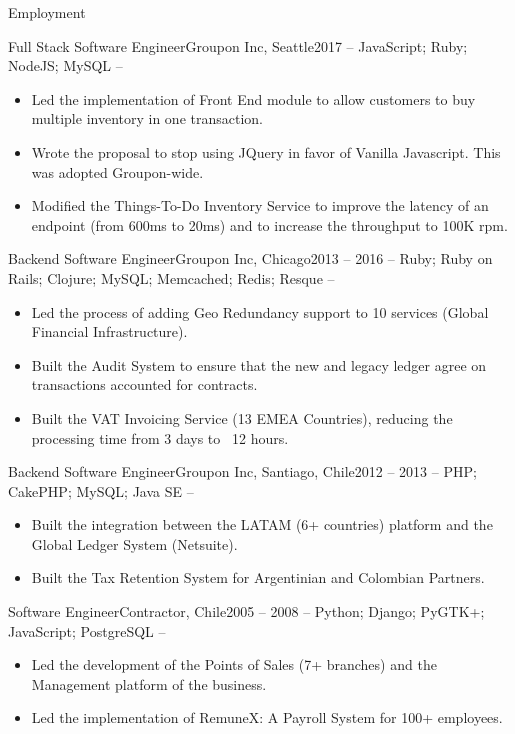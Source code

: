 \documentclass[includefoot]{mcdowellcv}
\begin{document}
\begin{cvsection}{Employment}
\begin{cvsubsection}{Full Stack Software Engineer}{Groupon Inc, Seattle}{2017}
			 -- JavaScript; Ruby; NodeJS; MySQL --
			\begin{itemize}
			 	\item Led the implementation of Front End module to allow customers to buy multiple inventory in one transaction. 
				\item Wrote the proposal to stop using JQuery in favor of Vanilla Javascript. This was adopted Groupon-wide. 
				\item Modified the Things-To-Do Inventory Service to improve the latency of an endpoint (from 600ms to 20ms) and to increase the throughput to 100K rpm.
			\end{itemize}
		\end{cvsubsection}
		\begin{cvsubsection}{Backend Software Engineer}{Groupon Inc, Chicago}{2013 -- 2016}
			 -- Ruby; Ruby on Rails; Clojure; MySQL; Memcached; Redis; Resque --
			\begin{itemize}
				\item Led the process of adding Geo Redundancy support to 10 services (Global Financial Infrastructure).
				\item Built the Audit System to ensure that the new and legacy ledger agree on transactions accounted for contracts.
				\item Built the VAT Invoicing Service (13 EMEA Countries), reducing the processing time from 3 days to ~12 hours.
			\end{itemize}
		\end{cvsubsection}
		\begin{cvsubsection}{Backend Software Engineer}{Groupon Inc, Santiago, Chile}{2012 -- 2013}
			 -- PHP; CakePHP; MySQL; Java SE --
			\begin{itemize}
				\item Built the integration between the LATAM (6+ countries) platform and the Global Ledger System (Netsuite).
				\item Built the Tax Retention System for Argentinian and Colombian Partners.
			\end{itemize}
		\end{cvsubsection}		
		\begin{cvsubsection}{Software Engineer}{Contractor, Chile}{2005 -- 2008}
		         -- Python; Django; PyGTK+; JavaScript; PostgreSQL --
			\begin{itemize}
				\item Led the development of the Points of Sales (7+ branches) and the Management platform of the business.
				\item Led the implementation of RemuneX: A Payroll System for 100+ employees.
			\end{itemize}
		\end{cvsubsection}
	\end{cvsection}
	
\end{document}
